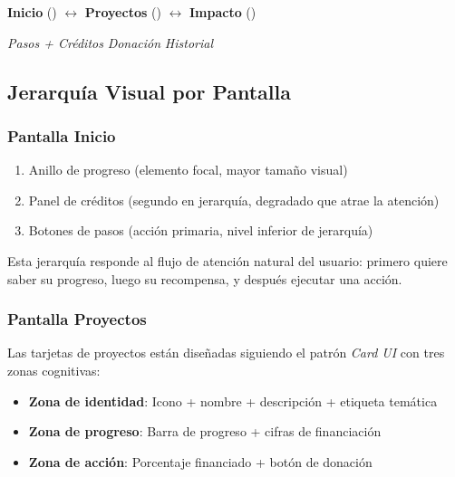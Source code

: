 \documentclass[12pt, a4paper]{article}
\begin{document}
\begin{center}
\begin{mdframed}[backgroundcolor=nativoPale, linecolor=nativoPrimary, linewidth=1pt, roundcorner=6pt]
\begin{center}
\vspace{8pt}
\textbf{Inicio} (\faHome) \quad $\leftrightarrow$ \quad \textbf{Proyectos} (\faLeaf) \quad $\leftrightarrow$ \quad \textbf{Impacto} (\faChartBar)
\vspace{4pt}

\textit{Pasos + Créditos} \quad\quad\quad \textit{Donación} \quad\quad\quad \textit{Historial}
\vspace{8pt}
\end{center}
\end{mdframed}
\end{center}

\subsection{Jerarquía Visual por Pantalla}

\subsubsection{Pantalla Inicio}

\begin{enumerate}[label=\textbf{\arabic*.}]
  \item Anillo de progreso (elemento focal, mayor tamaño visual)
  \item Panel de créditos (segundo en jerarquía, degradado que atrae la atención)
  \item Botones de pasos (acción primaria, nivel inferior de jerarquía)
\end{enumerate}

Esta jerarquía responde al flujo de atención natural del usuario: primero quiere saber su progreso, luego su recompensa, y después ejecutar una acción.

\subsubsection{Pantalla Proyectos}

Las tarjetas de proyectos están diseñadas siguiendo el patrón \textit{Card UI} con tres zonas cognitivas:
\begin{itemize}
  \item \textbf{Zona de identidad}: Icono + nombre + descripción + etiqueta temática
  \item \textbf{Zona de progreso}: Barra de progreso + cifras de financiación
  \item \textbf{Zona de acción}: Porcentaje financiado + botón de donación
\end{itemize}
\end{document}
